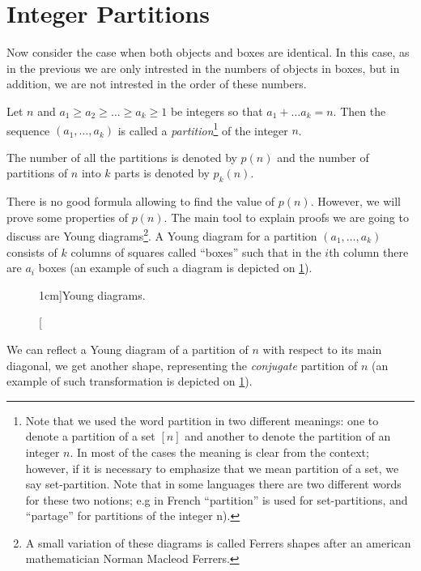 \section{Integer Partitions}
Now consider the case when both objects and boxes are identical. In this case,
as in the previous we are only intrested in the numbers of objects in boxes, but
in addition, we are not intrested in the order of these numbers.

\begin{definition}
  Let $n$ and $a_1 \ge a_2 \ge \dots \ge a_k \ge 1$ be integers so that
  $a_1 + \dots a_k = n$. Then the sequence $(a_1, \dots, a_k)$ is called
  a \emph{partition}\footnote{%
    Note that we used the word partition in two different meanings: one to
    denote a partition of a set $[n]$ and another to denote the partition of
    an integer $n$. In most of the cases the meaning is clear from the context;
    however, if it is necessary to emphasize that we mean partition of a set,
    we say set-partition. Note that in some languages there are two different
    words for these two notions; e.g in French ``partition'' is used for
    set-partitions, and ``partage'' for partitions of the integer n).
  } of the integer $n$.

  The number of all the partitions is denoted by $p(n)$ and the number of
  partitions of $n$ into $k$ parts is denoted by $p_k(n)$.
\end{definition}



There is no good formula allowing to find the value of $p(n)$. However, we will
prove some properties of $p(n)$. The main tool to explain proofs we are going to
discuss are Young diagrams\footnote{%
  A small variation of these diagrams is called Ferrers shapes after an
  american mathematician Norman Macleod Ferrers.
}.
A Young diagram for a partition $(a_1, \dots, a_k)$ consists of $k$ columns of
squares called ``boxes'' such that in the $i$th column there are $a_i$ boxes
(an example of such a diagram is depicted on \ref{figure:young-diagram-example}).
\begin{figure}
  \centering
  \qquad\qquad
  \caption[][1cm]{Young diagrams.}
  \label{figure:young-diagram-example}
\end{figure}
We can reflect a Young diagram of a partition of $n$ with respect to its main
diagonal, we get another shape, representing the \emph{conjugate} partition of
$n$ (an example of such transformation is depicted on
\ref{figure:young-diagram-example}).

